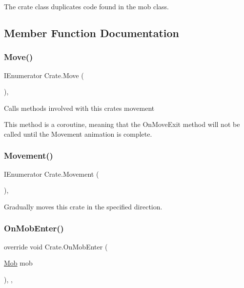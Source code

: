 The crate class duplicates code found in the mob class. 

\subsection{Member Function Documentation}
\mbox{\label{class_crate_ada60ced25b7e3edb1fc121a2f1ab6591}} 
\subsubsection{\texorpdfstring{Move()}{Move()}}
{\footnotesize\ttfamily I\+Enumerator Crate.\+Move (\begin{DoxyParamCaption}{ }\end{DoxyParamCaption})\hspace{0.3cm}{\ttfamily [inline]}, {\ttfamily [protected]}}



Calls methods involved with this crate\textquotesingle{}s movement 

This method is a coroutine, meaning that the On\+Move\+Exit method will not be called until the Movement animation is complete. \mbox{\label{class_crate_af23a671cf3d73990939b70933e6e7578}} 
\subsubsection{\texorpdfstring{Movement()}{Movement()}}
{\footnotesize\ttfamily I\+Enumerator Crate.\+Movement (\begin{DoxyParamCaption}{ }\end{DoxyParamCaption})\hspace{0.3cm}{\ttfamily [inline]}, {\ttfamily [protected]}}



Gradually moves this crate in the specified direction. 

\mbox{\label{class_crate_a31ad15231807013089177c2c4dc9ac0e}} 
\subsubsection{\texorpdfstring{On\+Mob\+Enter()}{OnMobEnter()}}
{\footnotesize\ttfamily override void Crate.\+On\+Mob\+Enter (\begin{DoxyParamCaption}\item[{\mbox{\hyperlink{class_mob}{Mob}}}]{mob }\end{DoxyParamCaption})\hspace{0.3cm}{\ttfamily [inline]}, {\ttfamily [protected]}, {\ttfamily [virtual]}}



